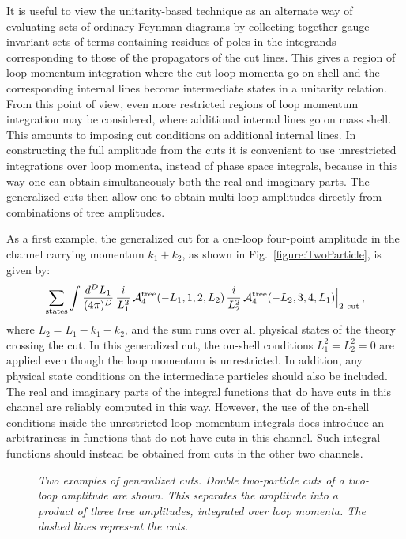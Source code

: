 It is useful to view the unitarity-based technique as an alternate way
of evaluating sets of ordinary Feynman diagrams by collecting together
gauge-invariant sets of terms containing residues of poles in the
integrands corresponding to those of the propagators of the cut
lines. This gives a region of loop-momentum integration where the cut
loop momenta go on shell and the corresponding internal lines become
intermediate states in a unitarity relation.  From this point of view,
even more restricted regions of loop momentum integration may be
considered, where additional internal lines go on mass shell.  This
amounts to imposing cut conditions on additional internal lines.  In
constructing the full amplitude from the cuts it is convenient to use
unrestricted integrations over loop momenta, instead of phase space
integrals, because in this way one can obtain simultaneously both the
real and imaginary parts. The generalized cuts then allow one to
obtain multi-loop amplitudes directly from combinations of tree
amplitudes.


As a first example, the generalized cut for a one-loop four-point
amplitude in the channel carrying momentum $k_1 + k_2$, as shown in
Fig.~\ref{figure:TwoParticle}, is given by: 
%
\begin{equation}
 \sum_{\rm states} \int {d^D L_1 \over (4 \pi)^D} \, 
  {i\over L_1^2} \,
{\cal A}_{4}^{\rm tree}(-L_1,1,2,L_2) \,{i \over L_2^2}\,
{\cal A}_{4}^{\rm tree} (-L_2,3,4,L_1) \Bigr|_{\rm2\ cut} \,, 
\label{BasicCutEquation}
\end{equation}
%
where $L_2 = L_1 - k_1 - k_2$, and the sum runs over all physical
states of the theory crossing the cut.  In this generalized cut, the
on-shell conditions $L_1^2 = L_2^2 = 0$ are applied even though the
loop momentum is unrestricted.  In addition, any physical state
conditions on the intermediate particles should also be included.  The
real and imaginary parts of the integral functions that do have cuts
in this channel are reliably computed in this way. However, the use of the
on-shell conditions inside the unrestricted loop momentum integrals does
introduce an arbitrariness in functions that do not have cuts in this
channel. Such integral functions should instead be obtained from cuts
in the other two channels.


\begin{figure}[h]
  \def\epsfsize#1#2{0.9#1} \centerline{}
  \caption{\it Two examples of generalized cuts. Double two-particle
  cuts of a two-loop amplitude are shown. This separates the amplitude into a
  product of three tree amplitudes, integrated over loop momenta.  The
  dashed lines represent the cuts. }
\label{figure:DoubleDoubleAmpl}
\end{figure}


